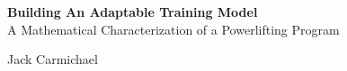 \documentclass[footheight=20pt, footsepline, headheight=20pt, headsepline]{book}
\begin{document}

\begingroup
\thispagestyle{empty}
\centering
\vspace*{8cm}
\par\normalfont\fontsize{35}{35}\sffamily\selectfont
\textbf{Building An Adaptable Training Model}\\
{\LARGE A Mathematical Characterization of a Powerlifting Program}\par %
\vspace*{1cm}
{\Huge Jack Carmichael}\par %
\endgroup
\end{document}
